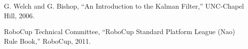 

\begin{thebibliography}{30}


 G. Welch and G. Bishop, ``An Introduction to the Kalman Filter,'' UNC-Chapel Hill, 2006.

 RoboCup Technical Committee, ``RoboCup Standard Platform League (Nao) Rule Book,'' RoboCup, 2011.

\end{thebibliography}
